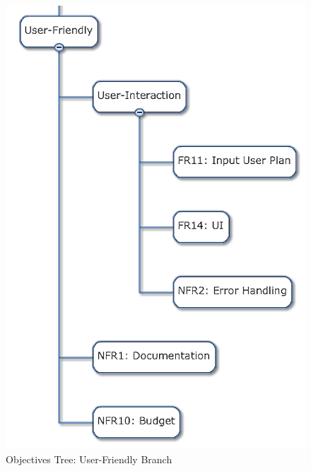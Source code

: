 \begin{figure}[!ht]
\centering
\includegraphics[width=0.98\columnwidth]{figs/objectives_tree/objectives_tree_user_friendly.png}
\caption{Objectives Tree: User-Friendly Branch}
\label{fig:obj_tree_user}
\end{figure}


